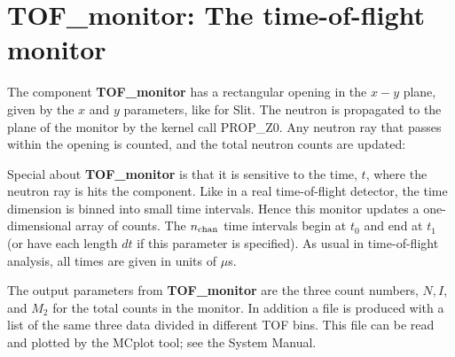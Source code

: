 
\section{TOF\_monitor: The time-of-flight monitor}

The component {\bf TOF\_monitor} has a rectangular opening
in the $x-y$ plane, given by the $x$ and $y$ parameters,
like for {\rm Slit}.
The neutron is propagated to the plane of the monitor
by the kernel call PROP\_Z0.
Any neutron ray that passes within the opening is counted, and
the total neutron counts are updated:

Special about {\bf TOF\_monitor} is that it is sensitive to
the time, $t$, where the neutron ray is hits the component.
Like in a real time-of-flight detector, the time dimension is
binned into small time intervals.
Hence this monitor updates a one-dimensional array of counts.
The $n_{\rm chan}$ time intervals begin at $t_0$ and
end at $t_1$ (or have each length $dt$ if this parameter is specified).
As usual in time-of-flight analysis, all times are given in units of $\mu$s.

The output parameters from {\bf TOF\_monitor} are the three count numbers,
$N, I$, and $M_2$ for the total counts in the monitor.
In addition a file is produced with a list of the same three data divided in
different TOF bins.
This file can be read and plotted by the {\rm MCplot} tool; see the
System Manual.

